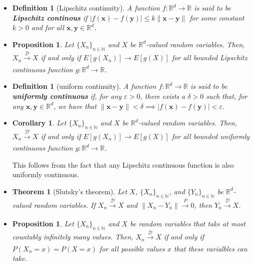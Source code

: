 \documentclass[10pt]{article}
\newtheorem{theorem}[lemma]{Theorem}
\newtheorem{definition}[lemma]{Definition}
\newtheorem{proposition}[lemma]{Proposition}
\newtheorem{corollary}[lemma]{Corollary}
\numberwithin{lemma}{section}
\newcommand{\ve}[1]{\mathbf{#1}}
\newcommand{\ra}{\rightarrow}
\newcommand{\mcal}[1]{\mathcal{#1}}
\newcommand{\Real}{\mathbb{R}}
\newcommand{\Nat}{\mathbb{N}}
\begin{document}
\begin{itemize}
  \item \begin{definition}[Lipschitz continuity]
    A function $f: \Real^d \ra \Real$ is said to be {\bf Lipschitz continous} if $| f(\ve{x}) - f(\ve{y}) | \leq k\| \ve{x} - \ve{y} \|$ for some constant $k > 0$ and for all $\ve{x}, \ve{y} \in \Real^d$.
  \end{definition}

  \item \begin{proposition}
    Let $\{ X_n \}_{n \in \Nat}$ and $X$ be $\Real^d$-valued random variables. Then, $X_n \xrightarrow[]{\mcal{D}} X$ if and only if $E[g(X_n)] \rightarrow E[g(X)]$ for all bounded Lipschitz continuous function $g: \Real^d \ra \Real$.
  \end{proposition}

  \item \begin{definition}[uniform continuity]
    A function $f: \Real^d \ra \Real$ is said to be {\bf uniformly continuous} if, for any $\varepsilon > 0$, there exists a $\delta > 0$ such that, for any $\ve{x}, \ve{y} \in \Real^d$, we have that $\| \ve{x} - \ve{y} \| < \delta \implies | f(\ve{x}) - f(\ve{y}) | < \varepsilon.$
  \end{definition}

  \item \begin{corollary}
    Let $\{ X_n \}_{n \in \Nat}$ and $X$ be $\Real^d$-valued random variables. Then, $X_n \xrightarrow[]{\mcal{D}} X$ if and only if $E[g(X_n)] \rightarrow E[g(X)]$ for all bounded uniformly continuous function $g: \Real^d \ra \Real$.
  \end{corollary}
  This follows from the fact that any Lipschitz continuous function is also uniformly continuous. 

  \item \begin{theorem}[Slutsky's theorem]
    Let $X$, $\{ X_n \}_{n \in \Nat}$, and $\{ Y_n \}_{n \in \Nat}$ be $\Real^d$-valued random variables. If $X_n \xrightarrow[]{\mcal{D}} X$ and $\| X_n - Y_n \| \xrightarrow[]{P} 0$, then $Y_n \xrightarrow[]{\mcal{D}} X$.
  \end{theorem}

  \item \begin{proposition}
    Let $\{ X_n \}_{n \in \Nat}$ and $X$ be random variables that take at most countably infinitely many values. Then, $X_n \xrightarrow[]{\mcal{D}} X$ if and only if $P(X_n = x) = P(X = x)$ for all possible values $x$ that these varialbles can take. 
  \end{proposition}
\end{itemize}
\end{document}
